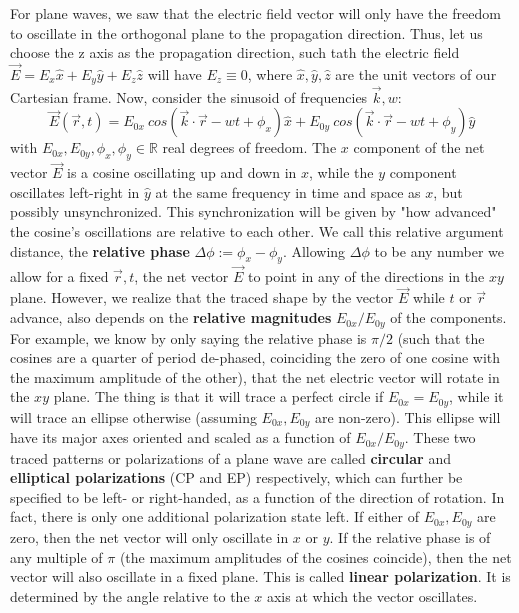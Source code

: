 \documentclass[11pt, a4paper, twoside]{article} %
\newcommand{\R}{\mathbb{R}} %
\begin{document}
{For plane waves, we saw that the electric field vector will only have the freedom to oscillate in the orthogonal plane to the propagation direction. Thus, let us choose the z axis as the propagation direction, such tath the electric field $\vec{E}=E_x\hat{x}+E_y\hat{y}+E_z\hat{z}$ will have $E_z\equiv  0$, where $\hat{x},\hat{y},\hat{z}$ are the unit vectors of our Cartesian frame. Now, consider the sinusoid of frequencies $\vec{k},w$:
\begin{equation}
\vec{E}(\vec{r},t)=E_{0x}\ cos(\vec{k}\cdot\vec{r}-wt+\phi_x)\hat{x}+ E_{0y}\ cos(\vec{k}\cdot\vec{r}-wt+\phi_y)\hat{y}
\end{equation} 
with $E_{0x},E_{0y},\phi_x,\phi_y\in\R$ real degrees of freedom. The $x$ component of the net vector $\vec{E}$ is a cosine oscillating up and down in $\hat{x}$, while the $y$ component oscillates left-right in $\hat{y}$ at the same frequency in time and space as $x$, but possibly unsynchronized. This synchronization will be given by "how advanced" the cosine's oscillations are relative to each other. We call this relative argument distance, the {\bf relative phase} $\Delta \phi:=\phi_x-\phi_y$. Allowing $\Delta \phi$ to be any number we allow for a fixed $\vec{r},t$, the net vector $\vec{E}$ to point in any of the directions in the $xy$ plane. However, we realize that the traced shape by the vector $\vec{E}$ while $t$ or $\vec{r}$ advance, also depends on the {\bf relative magnitudes} $E_{0x}/E_{0y}$ of the components. For example, we know by only saying the relative phase is $\pi/2$ (such that the cosines are a quarter of period de-phased, coinciding the zero of one cosine with the maximum amplitude of the other), that the net electric vector will rotate in the $xy$ plane. The thing is that it will trace a perfect circle if $E_{0x}=E_{0y}$, while it will trace an ellipse otherwise (assuming $E_{0x},E_{0y}$ are non-zero). This ellipse will have its major axes oriented and scaled as a function of $E_{0x}/E_{0y}$. These two traced patterns or polarizations of a plane wave are called {\bf circular} and {\bf elliptical polarizations} (CP and EP) respectively, which can further be specified to be left- or right-handed, as a function of the direction of rotation. In fact, there is only one additional polarization state left. If either of $E_{0x},E_{0y}$ are zero, then the net vector will only oscillate in $x$ or $y$. If the relative phase is of any multiple of $\pi$ (the maximum amplitudes of the cosines coincide), then the net vector will also oscillate in a fixed plane. This is called {\bf linear polarization}. It is determined by the angle relative to the $x$ axis at which the vector oscillates. }
\end{document}
